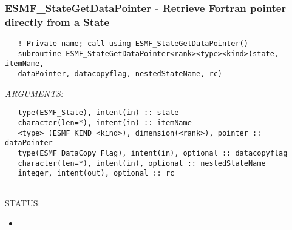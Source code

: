 
\setlength{\oldparskip}{\parskip}
\setlength{\parskip}{1.5ex}
\setlength{\oldparindent}{\parindent}
\setlength{\parindent}{0pt}
\setlength{\oldbaselineskip}{\baselineskip}
\setlength{\baselineskip}{11pt}
 
\def\bv{\begin{verbatim}}
\def\ev{\end{verbatim}}
\def\be{\begin{equation}}
\def\ee{\end{equation}}
\def\bea{\begin{eqnarray}}
\def\eea{\end{eqnarray}}
\def\bi{\begin{itemize}}
\def\ei{\end{itemize}}
\def\bn{\begin{enumerate}}
\def\en{\end{enumerate}}
\def\bd{\begin{description}}
\def\ed{\end{description}}
\def\({\left (}
\def\){\right )}
\def\[{\left [}
\def\]{\right ]}
\def\<{\left  \langle}
\def\>{\right \rangle}
\def\cI{{\cal I}}
\def\diag{\mathop{\rm diag}}
\def\tr{\mathop{\rm tr}}


 
\subsubsection [ESMF\_StateGetDataPointer] {ESMF\_StateGetDataPointer - Retrieve Fortran pointer directly from a State }


   
\begin{verbatim}   ! Private name; call using ESMF_StateGetDataPointer() 
   subroutine ESMF_StateGetDataPointer<rank><type><kind>(state, itemName, 
   dataPointer, datacopyflag, nestedStateName, rc) 
   \end{verbatim}{\em ARGUMENTS:}
\begin{verbatim}   type(ESMF_State), intent(in) :: state 
   character(len=*), intent(in) :: itemName 
   <type> (ESMF_KIND_<kind>), dimension(<rank>), pointer :: dataPointer 
   type(ESMF_DataCopy_Flag), intent(in), optional :: datacopyflag 
   character(len=*), intent(in), optional :: nestedStateName 
   integer, intent(out), optional :: rc 
   
   \end{verbatim}
{\sf STATUS:}
   \begin{itemize} 
   \item{} 
   \end{itemize} 
   
